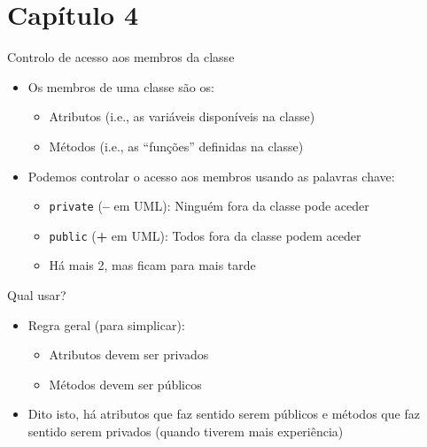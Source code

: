 \documentclass[portuguese, aspectratio=169, xcolor=table]{beamer}
\begin{document}
\section{Capítulo 4}
\begin{frame}{Controlo de acesso aos membros da classe}
\begin{itemize}
    \item Os membros de uma classe são os:
    \begin{itemize}
        \item Atributos (i.e., as variáveis disponíveis na classe)
        \item Métodos (i.e., as ``funções'' definidas na classe)
    \end{itemize}
    \item Podemos controlar o acesso aos membros usando as palavras chave:
    \begin{itemize}
        \item \texttt{private} (\textbf{--} em UML): Ninguém fora da classe pode aceder
        \item \texttt{public}  (\textbf{+} em UML): Todos fora da classe podem aceder
        \item Há mais 2, mas ficam para mais tarde
    \end{itemize}
\end{itemize}
\vfill

\begin{block}{Qual usar?}
\begin{itemize}
    \item Regra geral (para simplicar):
    \begin{itemize}
        \item Atributos devem ser privados
        \item Métodos devem ser públicos
    \end{itemize}
    \item Dito isto, há atributos que faz sentido serem públicos e métodos que faz sentido serem privados (quando tiverem mais experiência)
\end{itemize}
\end{block}
\end{frame}
\end{document}
